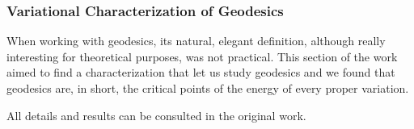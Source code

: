 \subsubsection*{Variational Characterization of Geodesics}

When working with geodesics, its natural, elegant definition, although really interesting for theoretical purposes, was not practical. This section of the work aimed to find a characterization that let us study geodesics and we found that geodesics are, in short, the critical points of the energy of every proper variation.

All details and results can be consulted in the original work.